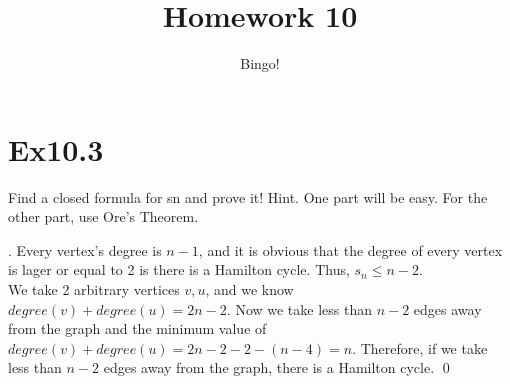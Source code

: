 \documentclass[12pt]{article}
\title{Homework 10}
\author{Bingo!}
\newenvironment{sol}
  {\par\vspace{3mm}\noindent{\it Solution}.}
  {\qed}
\begin{document}

\section{Ex10.3}
Find a closed formula for sn and prove it! Hint. One part will be easy. For the other part, use Ore’s Theorem.
\begin{sol}
Every vertex's degree is $n-1$, and it is obvious that the degree of every vertex is lager or equal to 2 is there is a Hamilton cycle. Thus, $s_n \le n-2$.\\
We take 2 arbitrary vertices $v,u$, and we know $degree(v)+degree(u)=2n-2$. Now we take less than $n-2$ edges away from the graph and the minimum value of $degree(v)+degree(u)=2n-2-2-(n-4)=n$. Therefore, if we take less than $n-2$ edges away from the graph, there is a Hamilton cycle.
\end{sol}
\end{document}
